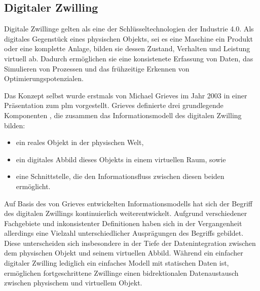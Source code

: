 
\newpage
\subsection{Digitaler Zwilling}
Digitale Zwillinge gelten als eine der Schlüsseltechnologien der Industrie 4.0.
Als digitales Gegenstück eines physischen Objekts, sei es eine Maschine ein Produkt oder eine komplette Anlage, bilden sie dessen Zustand, Verhalten und Leistung virtuell ab.
Dadurch ermöglichen sie eine konsistenete Erfassung von Daten, das Simulieren von Prozessen und das frühzeitige Erkennen von Optimierungspotenzialen.

Das Konzept selbst wurde erstmals von Michael Grieves im Jahr 2003 in einer Präsentation zum \ac{plm} vorgestellt. 
Grieves definierte drei grundlegende Komponenten \cite{DTGrieves} , die zusammen das Informationsmodell des digitalen Zwilling bilden:
\begin{itemize}
    \item ein reales Objekt in der physischen Welt,
    \item ein digitales Abbild dieses Objekts in einem virtuellen Raum, sowie
    \item eine Schnittstelle, die den Informationsfluss zwischen diesen beiden ermöglicht.
\end{itemize}

Auf Basis des von Grieves entwickelten Informationsmodells hat sich der Begriff des digitalen Zwillings kontinuierlich weiterentwickelt.
Aufgrund verschiedener Fachgebiete und inkonsistenter Definitionen haben sich in der Vergangenheit allerdings eine Vielzahl unterschiedlicher Ausprägungen des Begriffs gebildet.
Diese unterscheiden sich insbesondere in der Tiefe der Datenintegration zwischen dem physischen Objekt und seinem virtuellen Abbild.
Während ein einfacher digitaler Zwilling lediglich ein einfaches Modell mit statischen Daten ist, ermöglichen fortgeschrittene Zwillinge einen bidrektionalen Datenaustausch zwischen physischem und virtuellem Objekt. 

